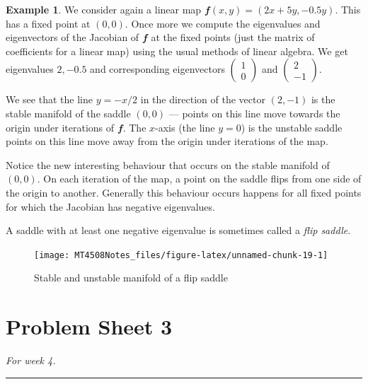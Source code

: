 \documentclass[
  a4paper,
  oneside,
  final]{krantz}
\renewcommand{\v}[1]{{\mathbfit{#1}}}
\theoremstyle{definition}
\theoremstyle{definition}
\newtheorem{example}{Example}[chapter]
\theoremstyle{definition}
\theoremstyle{definition}
\theoremstyle{remark}
\begin{document}
\begin{example}

We consider again a linear map \(\v{f}(x,y) = (2x+5y, -0.5y)\). This has a fixed point at \((0,0)\). Once more we compute the eigenvalues and eigenvectors of the Jacobian of \(\v{f}\) at the fixed points (just the matrix of coefficients for a linear map) using the usual methods of linear algebra. We get eigenvalues \(2, -0.5\) and corresponding eigenvectors \(\begin{pmatrix} 1 \\ 0 \end{pmatrix}\) and \(\begin{pmatrix} 2 \\ -1 \end{pmatrix}\).

We see that the line \(y = -x/2\) in the direction of the vector \((2, -1)\) is the stable manifold of the saddle \((0,0)\) --- points on this line move towards the origin under iterations of \(\v{f}\). The \(x\)-axis (the line \(y=0\)) is the unstable saddle points on this line move away from the origin under iterations of the map.

Notice the new interesting behaviour that occurs on the stable manifold of \((0,0)\). On each iteration of the map, a point on the saddle flips from one side of the origin to another. Generally this behaviour occurs happens for all fixed points for which the Jacobian has negative eigenvalues.

A saddle with at least one negative eigenvalue is sometimes called a \emph{flip saddle}.

\begin{figure}

{\centering \texttt{[image: MT4508Notes\_files/figure-latex/unnamed-chunk-19-1]} 

}

\caption{Stable and unstable manifold of a flip saddle}\label{fig:unnamed-chunk-19}
\end{figure}

\end{example}

\hypertarget{sheet3}{%
\section{Problem Sheet 3}\label{sheet3}}

\emph{For week 4.}

\begin{center}\rule{0.5\linewidth}{0.5pt}\end{center}
\end{document}
